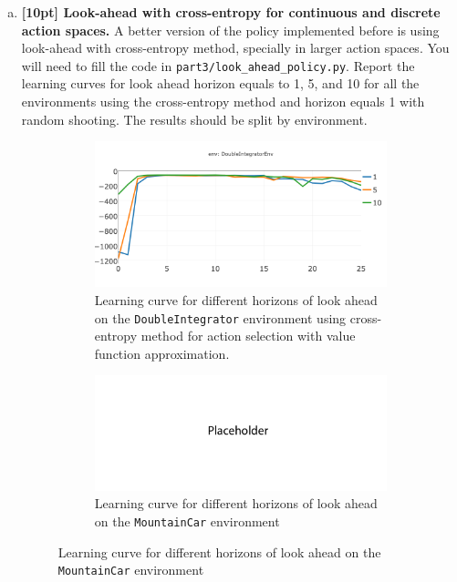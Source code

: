 \documentclass{article}
\begin{document}
\begin{enumerate}[(a)]
\newpage

\item {\bf [10pt] Look-ahead with cross-entropy for continuous and discrete action spaces.} A better version of the policy implemented before is using look-ahead with cross-entropy method, specially in larger action spaces. You will need to fill the code in \texttt{part3/look\_ahead\_policy.py}. Report the learning curves for look ahead horizon equals to 1, 5, and 10 for all the environments using the cross-entropy method and horizon equals 1 with random shooting. The results should be split by environment.

\begin{figure}[h!]
    \centering
    \begin{subfigure}{0.45\textwidth}
        \centering
        \includegraphics[width=\textwidth]{figures/part_3_b_a.png}
          \caption{Learning curve for different horizons of look ahead on the \texttt{DoubleIntegrator} environment using cross-entropy method for action selection with value function approximation.}
    \end{subfigure}
    \hspace{0.2in}
    \begin{subfigure}{0.45\textwidth}
        \centering
        \includegraphics[width=\textwidth]{figures/placeholder_2.png}
         \caption{Learning curve for different horizons of look ahead on the \texttt{MountainCar} environment
}
\end{subfigure}
\end{figure}
\end{enumerate}
\end{document}
